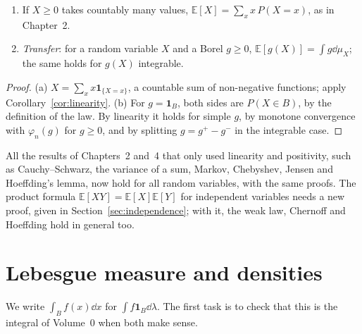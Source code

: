 \begin{proposition}\label{prop:consistency}
\begin{enumerate}[label=(\alph*)]
\item If $X\ge0$ takes countably many values, $\mathbb E[X]=\sum_xx\,P(X=x)$, as in Chapter~2.
\item \emph{Transfer}: for a random variable $X$ and a Borel $g\ge0$, $\mathbb E[g(X)]=\int g\dd\mu_X$; the same holds for $g(X)$ integrable.
\end{enumerate}
\end{proposition}
\begin{proof}
(a) $X=\sum_xx\mathbf 1_{\{X=x\}}$, a countable sum of non-negative functions; apply Corollary~\ref{cor:linearity}. (b) For $g=\mathbf 1_B$, both sides are
$P(X\in B)$, by the definition of the law. By linearity it holds for simple $g$, by monotone convergence with $\varphi_n(g)$ for
$g\ge0$, and by splitting $g=g^+-g^-$ in the integrable case.
\end{proof}

All the results of Chapters~2 and~4 that only used linearity and positivity, such as Cauchy--Schwarz, the
variance of a sum, Markov, Chebyshev, Jensen and Hoeffding's lemma, now hold for all random variables, with the same
proofs. The product formula $\mathbb E[XY]=\mathbb E[X]\mathbb E[Y]$ for independent variables needs a new proof, given in
Section~\ref{sec:independence}; with it, the weak law, Chernoff and Hoeffding hold in general too.

\section{Lebesgue measure and densities}

We write $\int_Bf(x)\dd x$ for $\int f\mathbf 1_B\dd\lambda$. The first task is to check that this is the integral of Volume~0 when both make sense.

